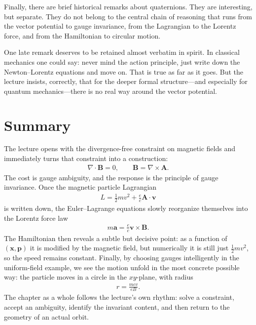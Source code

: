Finally, there are brief historical remarks about quaternions. They are interesting, but separate. They do not belong to the central chain of reasoning that runs from the vector potential to gauge invariance, from the Lagrangian to the Lorentz force, and from the Hamiltonian to circular motion.

One late remark deserves to be retained almost verbatim in spirit. In classical mechanics one could say: never mind the action principle, just write down the Newton--Lorentz equations and move on. That is true as far as it goes. But the lecture insists, correctly, that for the deeper formal structure---and especially for quantum mechanics---there is no real way around the vector potential.

\section{Summary}

The lecture opens with the divergence-free constraint on magnetic fields and immediately turns that constraint into a construction:
\begin{align}
\nabla\!\cdot\!\mathbf B=0,
\qquad
\mathbf B=\nabla\times\mathbf A.
\end{align}
The cost is gauge ambiguity, and the response is the principle of gauge invariance. Once the magnetic particle Lagrangian
\begin{align}
L=\frac{1}{2}mv^2+\frac{e}{c}\mathbf A\cdot\mathbf v
\end{align}
is written down, the Euler--Lagrange equations slowly reorganize themselves into the Lorentz force law
\begin{align}
m\mathbf a=\frac{e}{c}\mathbf v\times\mathbf B.
\end{align}
The Hamiltonian then reveals a subtle but decisive point: as a function of \((\mathbf x,\mathbf p)\) it is modified by the magnetic field, but numerically it is still just \(\frac{1}{2}mv^2\), so the speed remains constant. Finally, by choosing gauges intelligently in the uniform-field example, we see the motion unfold in the most concrete possible way: the particle moves in a circle in the \(xy\)-plane, with radius
\begin{align}
r=\frac{mcv}{eB}.
\end{align}
The chapter as a whole follows the lecture's own rhythm: solve a constraint, accept an ambiguity, identify the invariant content, and then return to the geometry of an actual orbit.
